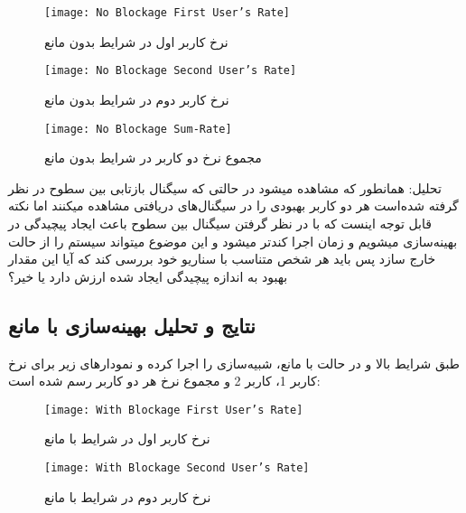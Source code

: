 \begin{figure}[!h]
	\begin{minipage}{0.5\textwidth}
		\centering
		\texttt{[image: No Blockage First User's Rate]}
		\captionsetup{width=0.8\linewidth}
		\caption[
		نرخ کاربر اول در شرایط بدون مانع
		]{
			نرخ کاربر اول در شرایط بدون مانع
		}
	\end{minipage}
	\hfill
	\begin{minipage}{0.5\textwidth}
		\centering
		\texttt{[image: No Blockage Second User's Rate]}
		\captionsetup{width=0.8\linewidth}
		\caption[
		نرخ کاربر دوم در شرایط بدون مانع
		]{
		نرخ کاربر دوم در شرایط بدون مانع
		}
	\end{minipage}
\end{figure}

\begin{figure}[!h]
	\centering
	\texttt{[image: No Blockage Sum-Rate]}
	\caption[مجموع نرخ دو کاربر در شرایط بدون مانع]{
		مجموع نرخ دو کاربر در شرایط بدون مانع
	}
\end{figure}

تحلیل: همانطور که مشاهده میشود در حالتی که سیگنال بازتابی بین سطوح در نظر گرفته شده‌است هر دو کاربر بهبودی را در سیگنال‌های دریافتی مشاهده میکنند اما نکته قابل توجه اینست که با در نظر گرفتن سیگنال بین سطوح باعث ایجاد پیچیدگی در بهینه‌سازی میشویم و زمان اجرا کندتر میشود و این موضوع میتواند سیستم را از حالت  خارج سازد پس باید هر شخص متناسب با سناریو خود بررسی کند که آیا این مقدار بهبود به اندازه پیچیدگی ایجاد شده ارزش دارد یا خیر؟
\newpage
\subsection{نتایج و تحلیل بهینه‌سازی با مانع}
طبق شرایط بالا و در حالت با مانع، شبیه‌سازی را اجرا کرده و نمودارهای زیر برای نرخ کاربر 1، کاربر 2 و مجموع نرخ هر دو کاربر رسم‌ شده ‌است:

\begin{figure}[!h]
	\begin{minipage}{0.5\textwidth}
		\centering
		\texttt{[image: With Blockage First User's Rate]}
		\captionsetup{width=0.8\linewidth}
		\caption[
		نرخ کاربر اول در شرایط با مانع
		]{
		نرخ کاربر اول در شرایط با مانع
		}
	\end{minipage}
	\hfill
	\begin{minipage}{0.5\textwidth}
		\centering
		\texttt{[image: With Blockage Second User's Rate]}
		\captionsetup{width=0.8\linewidth}
		\caption[
		نرخ کاربر دوم در شرایط با مانع
		]{
			نرخ کاربر دوم در شرایط با مانع
		}
	\end{minipage}
\end{figure}

